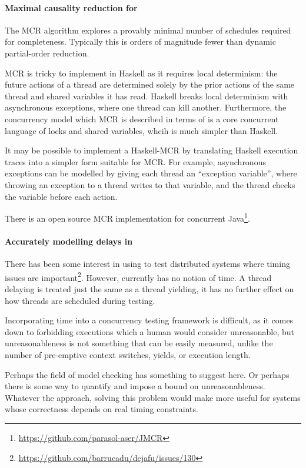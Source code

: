 \paragraph{Maximal causality reduction for \dejafu{}}
The MCR algorithm\cite{huang2015} explores a provably minimal number
of schedules required for completeness.  Typically this is orders of
magnitude fewer than dynamic partial-order reduction.

MCR is tricky to implement in Haskell as it requires local
determinism: the future actions of a thread are determined solely by
the prior actions of the same thread and shared variables it has read.
Haskell breaks local determinism with asynchronous exceptions, where
one thread can kill another.  Furthermore, the concurrency model which
MCR is described in terms of is a core concurrent language of locks
and shared variables, whcih is much simpler than Haskell.

It may be possible to implement a Haskell-MCR by translating Haskell
execution traces into a simpler form suitable for MCR.  For example,
asynchronous exceptions can be modelled by giving each thread an
``exception variable'', where throwing an exception to a thread writes
to that variable, and the thread checks the variable before each
action.

There is an open source MCR implementation for concurrent
Java\footnote{\url{https://github.com/parasol-aser/JMCR}}.

\paragraph{Accurately modelling delays in \dejafu{}}
There has been some interest in using \dejafu{} to test distributed
systems where timing issues are
important\footnote{\url{https://github.com/barrucadu/dejafu/issues/130}}.
However, \dejafu{} currently has no notion of time.  A thread delaying
is treated just the same as a thread yielding, it has no further
effect on how threads are scheduled during testing.

Incorporating time into a concurrency testing framework is difficult,
as it comes down to forbidding executions which a human would consider
unreasonable, but unreasonableness is not something that can be easily
measured, unlike the number of pre-emptive context switches, yields,
or execution length.

Perhaps the field of model checking has something to suggest here.  Or
perhaps there is some way to quantify and impose a bound on
unreasonableness.  Whatever the approach, solving this problem would
make \dejafu{} more useful for systems whose correctness depends on
real timing constraints.

